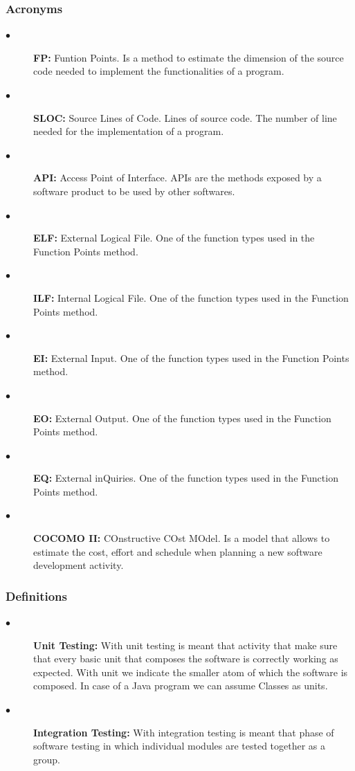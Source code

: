 \documentclass[a4paper,10pt]{article}
\begin{document}
  \subsubsection{Acronyms}
  \begin{description}
    \item[$\bullet$] \textbf{FP:} Funtion Points. Is a method to estimate the dimension of the source code needed to implement
    the functionalities of a program.
    \item[$\bullet$] \textbf{SLOC:} Source Lines of Code. Lines of source code. The number of line needed for the implementation of
    a program.
    \item[$\bullet$] \textbf{API:} Access Point of Interface. APIs are the methods exposed by a software product to be used by other 
    softwares.
    \item[$\bullet$] \textbf{ELF:} External Logical File. One of the function types used in the Function Points method.
    \item[$\bullet$] \textbf{ILF:} Internal Logical File. One of the function types used in the Function Points method.
    \item[$\bullet$] \textbf{EI:} External Input. One of the function types used in the Function Points method.
    \item[$\bullet$] \textbf{EO:} External Output. One of the function types used in the Function Points method.
    \item[$\bullet$] \textbf{EQ:} External inQuiries. One of the function types used in the Function Points method.
    \item[$\bullet$] \textbf{COCOMO II:} COnstructive COst MOdel. Is a model that allows to estimate the cost, effort and schedule when planning
    a new software development activity.
  \end{description}
  \subsubsection{Definitions}
   \begin{description}
   \item[$\bullet$] \textbf{Unit Testing:} With unit testing is meant that activity that make sure that every basic unit that composes the software is correctly 
   working as expected. With unit we indicate the smaller atom of which the software is composed. In case of a Java program we can assume Classes as units.
   \item[$\bullet$] \textbf{Integration Testing:} With integration testing is meant that phase 
   of software testing in which individual modules are tested together as a group.
   
   \end{description}
\end{document}
